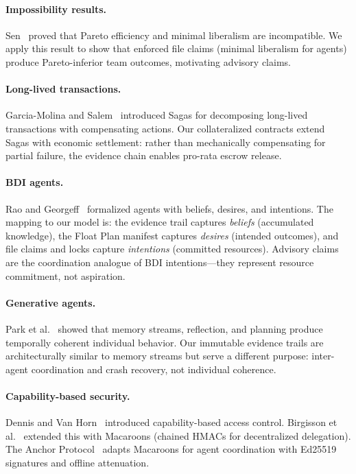 \documentclass[11pt,a4paper]{article}
\theoremstyle{definition}
\theoremstyle{remark}
\begin{document}
\paragraph{Impossibility results.} Sen~\cite{sen1970impossibility} proved that Pareto efficiency and minimal liberalism are incompatible. We apply this result to show that enforced file claims (minimal liberalism for agents) produce Pareto-inferior team outcomes, motivating advisory claims.

\paragraph{Long-lived transactions.} Garcia-Molina and Salem~\cite{garciamolina1987sagas} introduced Sagas for decomposing long-lived transactions with compensating actions. Our collateralized contracts extend Sagas with economic settlement: rather than mechanically compensating for partial failure, the evidence chain enables pro-rata escrow release.

\paragraph{BDI agents.} Rao and Georgeff~\cite{rao1991modeling} formalized agents with beliefs, desires, and intentions. The mapping to our model is: the evidence trail captures \emph{beliefs} (accumulated knowledge), the Float Plan manifest captures \emph{desires} (intended outcomes), and file claims and locks capture \emph{intentions} (committed resources). Advisory claims are the coordination analogue of BDI intentions---they represent resource commitment, not aspiration.

\paragraph{Generative agents.} Park et al.~\cite{park2023generative} showed that memory streams, reflection, and planning produce temporally coherent individual behavior. Our immutable evidence trails are architecturally similar to memory streams but serve a different purpose: inter-agent coordination and crash recovery, not individual coherence.

\paragraph{Capability-based security.} Dennis and Van Horn~\cite{dennis1966programming} introduced capability-based access control. Birgisson et al.~\cite{birgisson2014macaroons} extended this with Macaroons (chained HMACs for decentralized delegation). The Anchor Protocol~\cite{owens2026anchor} adapts Macaroons for agent coordination with Ed25519 signatures and offline attenuation.
\end{document}
